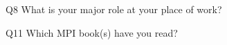 \begin{description}%
\item{Q8} What is your major role at your place of work?%
\item{Q11} Which MPI book(s) have you read?%
\end{description}%
